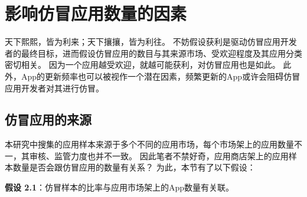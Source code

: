 \noindent{}

\section{影响仿冒应用数量的因素}
\label{sec:quantitativeStudy}
天下熙熙，皆为利来；天下攘攘，皆为利往。
不妨假设获利是驱动仿冒应用开发者的最终目标，进而假设仿冒应用的数目与其来源市场、受欢迎程度及其应用分类密切相关。
因为一个应用越受欢迎，就越可能获利，对仿冒应用也是如此。
此外，App的更新频率也可以被视作一个潜在因素，频繁更新的App或许会阻碍仿冒应用开发者对其进行仿冒。

\subsection{仿冒应用的来源}

本研究中搜集的应用样本来源于多个不同的应用市场，每个市场架上的应用数量不一，其审核、监管力度也并不一致。
因此笔者不禁好奇，应用商店架上的应用样本数量是否会跟仿冒应用的数量有关系？
为此，本节有了以下假设：

{\bf 假设 2.1}：仿冒样本的比率与应用市场架上的App数量有关联。

